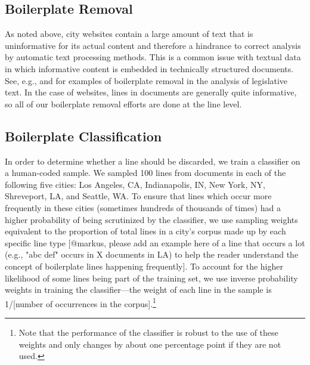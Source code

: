 \documentclass[11pt]{article}
\begin{document}
\subsection{Boilerplate Removal}\label{boilerplate}
As noted above, city websites contain a large amount of text that is uninformative for its actual content and therefore a hindrance to correct analysis by automatic text processing methods. This is a common issue with textual data in which informative content is embedded in technically structured documents. See, e.g., \citet{burgess2016legislative,wilkerson2015tracing} and \citet{linder2018text} for examples of boilerplate removal in the analysis of legislative text. In the case of websites, lines in documents are generally quite informative, so all of our boilerplate removal efforts are done at the line level.


\subsection*{Boilerplate Classification}
In order to determine whether a line should be discarded, we train a classifier on a human-coded sample. We sampled 100 lines from documents in each of the following five cities: Los Angeles, CA, Indianapolis, IN, New York, NY, Shreveport, LA, and Seattle, WA. To ensure that lines which occur more frequently in these cities (sometimes hundreds of thousands of times) had a higher probability of being scrutinized by the classifier, we use sampling weights equivalent to the proportion of total lines in a city's corpus made up by each specific line type [@markus, please add an example here of a line that occurs a lot (e.g., "abc def" occurs in X documents in LA) to help the reader understand the concept of boilerplate lines happening frequently]. To account for the higher likelihood of some lines being part of the training set, we use inverse probability weights in training the classifier---the weight of each line in the sample is 1/[number of occurrences in the corpus].\footnote{Note that the performance of the classifier is robust to the use of these weights and only changes by about one percentage point if they are not used.}
\end{document}
